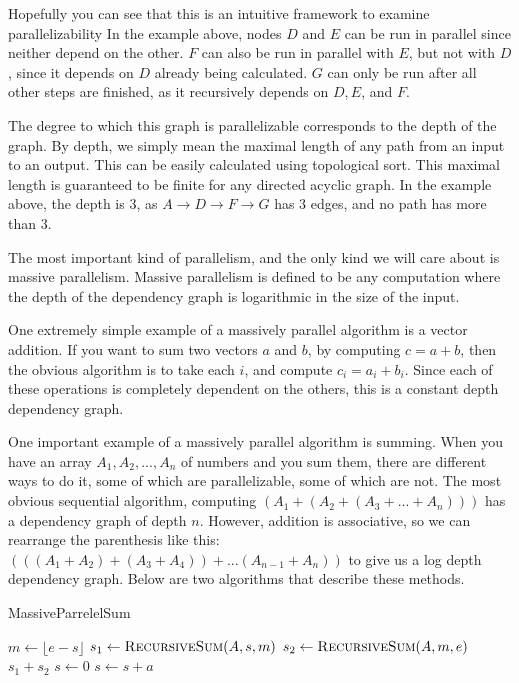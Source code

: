 \documentclass[12pt,twoside]{reedthesis}
\newcommand{\floor}[1]{\lfloor #1 \rfloor}
\begin{document}
		Hopefully you can see that this is an intuitive framework to examine parallelizability In the example above, nodes $D$ and $E$ can be run in parallel since neither depend on the other. $F$ can also be run in parallel with $E$, but not with $D$, since it depends on $D$ already being calculated. $G$ can only be run after all other steps are finished, as it recursively depends on $D,E$, and $F$.

		The degree to which this graph is parallelizable corresponds to the depth of the graph. By depth, we simply mean the maximal length of any path from an input to an output. This can be easily calculated using topological sort. This maximal length is guaranteed to be finite for any directed acyclic graph. In the example above, the depth is 3, as $A\rightarrow D \rightarrow F \rightarrow G$ has 3 edges, and no path has more than 3.

		The most important kind of parallelism, and the only kind we will care about is massive parallelism. Massive parallelism is defined to be any computation where the depth of the dependency graph is logarithmic in the size of the input.

		One extremely simple example of a massively parallel algorithm is a vector addition. If you want to sum two vectors $a$ and $b$, by computing $c = a+b$, then the obvious algorithm is to take each $i$, and compute $c_i = a_i + b_i$. Since each of these operations is completely dependent on the others, this is a constant depth dependency graph.

		One important example of a massively parallel algorithm is summing. When you have an array $A_1,A_2,...,A_n$ of numbers and you sum them, there are different ways to do it, some of which are parallelizable, some of which are not. The most obvious sequential algorithm, computing $(A_1+(A_2+(A_3+...+A_n)))$ has a dependency graph of depth $n$. However, addition is associative, so we can rearrange the parenthesis like this: $(((A_1+A_2)+(A_3+A_4))+...(A_{n-1}+A_n))$ to give us a log depth dependency graph. Below are two algorithms that describe these methods.

		\begin{algorithm}
			\caption{MassiveParrelelSum}\label{parellelsum}
			\begin{algorithmic}[1]
					\EndIf
					\State $m \gets \floor{e-s}$
					\State $s_1 \gets \textsc{RecursiveSum}(A,s,m)$
					\State $s_2 \gets \textsc{RecursiveSum}(A,m,e)$
					\State \Return $s_1+s_2$
				\EndFunction
					\State $s \gets 0$
						\State $s \gets s + a$
					\EndFor
				\EndFunction
			\end{algorithmic}
		\end{algorithm}
\end{document}
